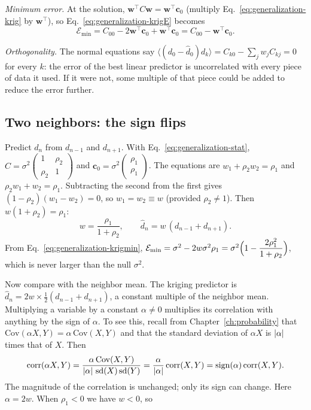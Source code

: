 \emph{Minimum error.} At the solution, $\bm w^\top C\bm w=\bm w^\top\bm c_0$ (multiply Eq.~\eqref{eq:generalization-krig} by $\bm w^\top$), so Eq.~\eqref{eq:generalization-krigE} becomes
\begin{equation}
\mathcal E_{\min}=C_{00}-2\bm w^\top\bm c_0+\bm w^\top\bm c_0=C_{00}-\bm w^\top\bm c_0.
\label{eq:generalization-krigmin}
\end{equation}

\emph{Orthogonality.} The normal equations say $\langle(d_0-\hat d_0)d_k\rangle=C_{k0}-\sum_jw_jC_{kj}=0$ for every $k$: the error of the best linear predictor is uncorrelated with every piece of data it used. If it were not, some multiple of that piece could be added to reduce the error further.

\subsection{Two neighbors: the sign flips}

Predict $d_n$ from $d_{n-1}$ and $d_{n+1}$. With Eq.~\eqref{eq:generalization-stat}, $C=\sigma^2\begin{pmatrix}1&\rho_2\\\rho_2&1\end{pmatrix}$ and $\bm c_0=\sigma^2\begin{pmatrix}\rho_1\\\rho_1\end{pmatrix}$. The equations are $w_1+\rho_2w_2=\rho_1$ and $\rho_2w_1+w_2=\rho_1$. Subtracting the second from the first gives $(1-\rho_2)(w_1-w_2)=0$, so $w_1=w_2\equiv w$ (provided $\rho_2\ne1$). Then $w(1+\rho_2)=\rho_1$:
\begin{equation}
w=\frac{\rho_1}{1+\rho_2},\qquad \hat d_n=w\,(d_{n-1}+d_{n+1}).
\label{eq:generalization-w}
\end{equation}
From Eq.~\eqref{eq:generalization-krigmin}, $\mathcal E_{\min}=\sigma^2-2w\sigma^2\rho_1=\sigma^2\Bigl(1-\dfrac{2\rho_1^2}{1+\rho_2}\Bigr)$, which is never larger than the null $\sigma^2$.

Now compare with the neighbor mean. The kriging predictor is $\hat d_n=2w\times\tfrac12(d_{n-1}+d_{n+1})$, a constant multiple of the neighbor mean. Multiplying a variable by a constant $\alpha\ne0$ multiplies its correlation with anything by the sign of $\alpha$. To see this, recall from Chapter~\ref{ch:probability} that $\mathrm{Cov}(\alpha X,Y)=\alpha\,\mathrm{Cov}(X,Y)$ and that the standard deviation of $\alpha X$ is $\left\lvert \alpha\right\rvert$ times that of $X$. Then
\[
\mathrm{corr}(\alpha X,Y)=\frac{\alpha\,\mathrm{Cov}(X,Y)}{\left\lvert \alpha\right\rvert\,\mathrm{sd}(X)\,\mathrm{sd}(Y)}=\frac{\alpha}{\left\lvert \alpha\right\rvert}\,\mathrm{corr}(X,Y)=\mathrm{sign}(\alpha)\,\mathrm{corr}(X,Y).
\]
The magnitude of the correlation is unchanged; only its sign can change. Here $\alpha=2w$. When $\rho_1<0$ we have $w<0$, so

